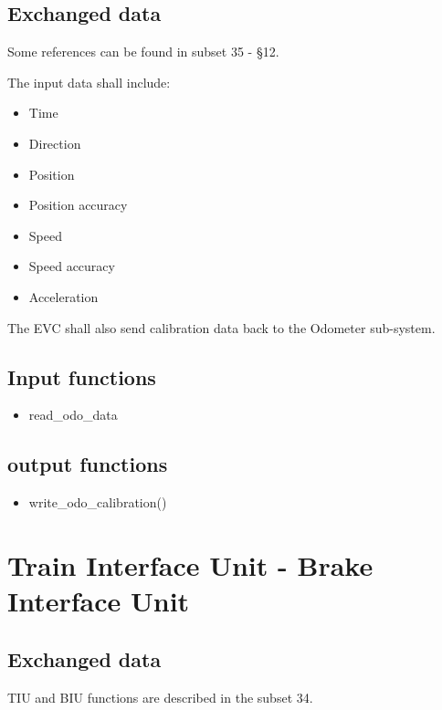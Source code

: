 \documentclass{template/openetcs_article}
\begin{document}
	\subsection{Exchanged data}
		Some references can be found in subset 35 - §12.
		
		The input data shall include:
		\begin{itemize}
			\item Time
			\item Direction
			\item Position
			\item Position accuracy
			\item Speed
			\item Speed accuracy
			\item Acceleration
		\end{itemize}
		
		The EVC shall also send calibration data back to the Odometer sub-system.		
	\subsection{Input functions}
		\begin{itemize}
			\item read\_odo\_data
		\end{itemize}
	\subsection{output functions}
		\begin{itemize}
			\item  write\_odo\_calibration()
		\end{itemize}
\section{Train Interface Unit - Brake Interface Unit}
	\subsection{Exchanged data}
		TIU and BIU functions are described in the subset 34.
			
\end{document}
